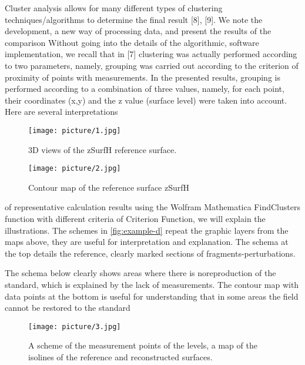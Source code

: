 \documentclass[8pt, a4paper]{article} %
\begin{document}
\begin{multicols}{2}
\fontsize{10}{14}
\selectfont 
\quad Cluster analysis allows for many different types of clustering techniques/algorithms to determine the final result [8], [9]. We note the development, a new way of
processing data, and present the results of the comparison Without going into the details of the algorithmic,
software implementation, we recall that in [7] clustering was actually performed according to two parameters,
namely, grouping was carried out according to the criterion of proximity of points with measurements. In the presented results, grouping is performed according to
a combination of three values, namely, for each point, their coordinates (x,y) and the z value (surface level) were taken into account. Here are several interpretations

\begin{figure}[H]
    \centering
    \texttt{[image: picture/1.jpg]}
    \caption{\small{3D views of the zSurfH reference surface.}}
    \label{fig:example-a}
\end{figure}

\begin{figure}[H]
    \centering
    \texttt{[image: picture/2.jpg]}
    \caption{\small{Contour map of the reference surface zSurfH}}
    \label{fig:example-b}
\end{figure}



of representative calculation results using the Wolfram Mathematica FindClusters function with different criteria of Criterion Function, we will explain the illustrations. The schemes in \autoref{fig:example-d} repeat the graphic layers from the maps above, they are useful for interpretation and explanation. The schema at the top details the reference, clearly marked sections of fragments-perturbations.

\fontsize{10}{14}
\selectfont 
\quad The schema below clearly shows areas where there is noreproduction of the standard, which is explained by
the lack of measurements. The contour map with data
points at the bottom is useful for understanding that in some areas the field cannot be restored to the standard



\begin{figure}[H]
    \centering
    \texttt{[image: picture/3.jpg]}
    \caption{\small{ A scheme of the measurement points of the levels, a map of the isolines of the reference and reconstructed surfaces.}}
    \label{fig:example-c}
\end{figure}


\end{multicols}
\end{document}
